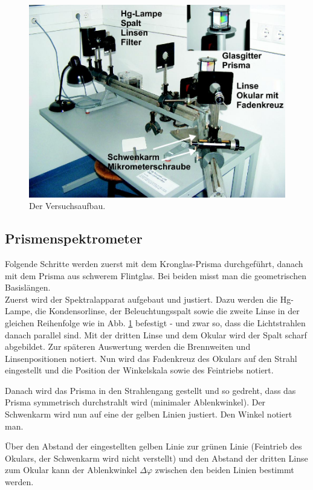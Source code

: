 \documentclass[12pt,a4paper,titlepage,headinclude,bibtotoc]{scrartcl}
\begin{document}
\begin{figure}[!h]
	\centering
	\includegraphics[scale=0.4]{Aufbau.jpg}
	\caption{Der Versuchsaufbau. \cite[Datum: 28.12.2014]{LP19}}
	\label{fig:aufbau}
\end{figure}

\subsection{Prismenspektrometer}
Folgende Schritte werden zuerst mit dem Kronglas-Prisma durchgeführt, danach mit dem Prisma aus schwerem Flintglas.
Bei beiden misst man die geometrischen Basislängen.\\

Zuerst wird der Spektralapparat aufgebaut und justiert.
Dazu werden die Hg-Lampe, die Kondensorlinse, der Beleuchtungsspalt sowie die zweite Linse in der gleichen Reihenfolge wie in Abb. \ref{fig:aufbau} befestigt - und zwar so, dass die Lichtstrahlen danach parallel sind.
Mit der dritten Linse und dem Okular wird der Spalt scharf abgebildet.
Zur späteren Auswertung werden die Brennweiten und Linsenpositionen notiert.
Nun wird das Fadenkreuz des Okulars auf den Strahl eingestellt und die Position der Winkelskala sowie des Feintriebs notiert.

Danach wird das Prisma in den Strahlengang gestellt und so gedreht, dass das Prisma symmetrisch durchstrahlt wird (minimaler Ablenkwinkel).
Der Schwenkarm wird nun auf eine der gelben Linien justiert.
Den Winkel notiert man.

Über den Abstand der eingestellten gelben Linie zur grünen Linie (Feintrieb des Okulars, der Schwenkarm wird nicht verstellt) und den Abstand der dritten Linse zum Okular kann der Ablenkwinkel $\Delta\varphi$ zwischen den beiden Linien bestimmt werden.
\end{document}
